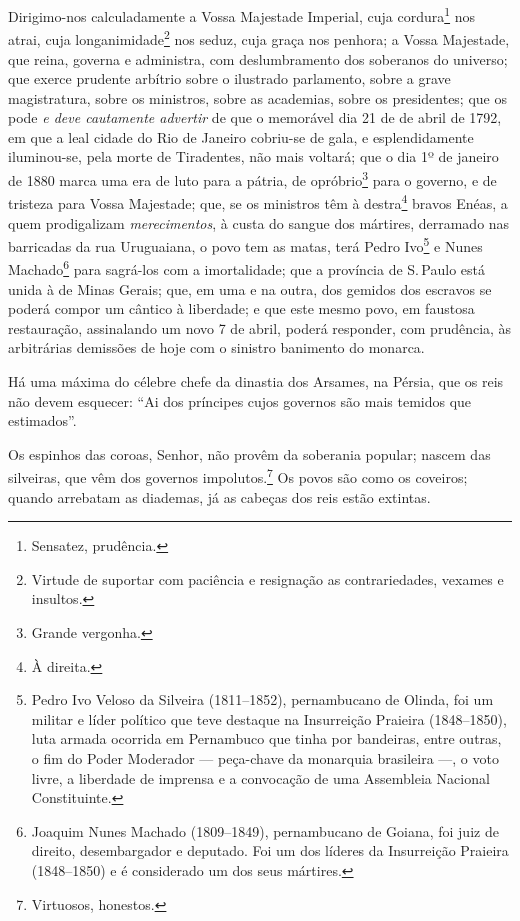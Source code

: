 {Dirigimo-nos calculadamente a Vossa Majestade Imperial, cuja
cordura\footnote{Sensatez, prudência.} nos atrai, cuja
longanimidade\footnote{Virtude de suportar com paciência e resignação
  as contrariedades, vexames e insultos.} nos seduz, cuja graça nos
penhora; a Vossa Majestade, que reina, governa e administra, com
deslumbramento dos soberanos do universo; que exerce prudente arbítrio
sobre o ilustrado parlamento, sobre a grave magistratura, sobre os
ministros, sobre as academias, sobre os presidentes; que os pode \emph{e
deve cautamente advertir} de que o memorável dia 21 de de abril de 1792,
em que a leal cidade do Rio de Janeiro cobriu-se de gala, e
esplendidamente iluminou-se, pela morte de Tiradentes, não mais voltará;
que o dia 1º de janeiro de 1880 marca uma era de luto para a pátria, de
opróbrio\footnote{Grande vergonha.} para o governo, e de tristeza para
Vossa Majestade; que, se os ministros têm à destra\footnote{À direita.}
bravos Enéas, a quem prodigalizam \emph{merecimentos}, à custa do sangue
dos mártires, derramado nas barricadas da rua Uruguaiana, o povo tem as
matas, terá Pedro Ivo\footnote{Pedro Ivo Veloso da Silveira
  (1811--1852), pernambucano de Olinda, foi um militar e líder político
  que teve destaque na Insurreição Praieira (1848--1850), luta armada
  ocorrida em Pernambuco que tinha por bandeiras, entre outras, o fim do
  Poder Moderador --- peça-chave da monarquia brasileira ---, o voto livre,
  a liberdade de imprensa e a convocação de uma Assembleia Nacional
  Constituinte.} e Nunes Machado\footnote{Joaquim Nunes Machado
  (1809--1849), pernambucano de Goiana, foi juiz de direito,
  desembargador e deputado. Foi um dos líderes da Insurreição Praieira
  (1848--1850) e é considerado um dos seus mártires.} para sagrá-los com
a imortalidade; que a província de S.\,Paulo está unida à de Minas
Gerais; que, em uma e na outra, dos gemidos dos escravos se poderá
compor um cântico à liberdade; e que este mesmo povo, em faustosa
restauração, assinalando um novo 7 de abril, poderá responder, com
prudência, às arbitrárias demissões de hoje com o sinistro banimento do
monarca.

Há uma máxima do célebre chefe da dinastia dos Arsames, na Pérsia,
que os reis não devem esquecer: ``Ai dos príncipes cujos governos são
mais temidos que estimados''.

Os espinhos das coroas, Senhor, não provêm da soberania popular; nascem
das silveiras, que vêm dos governos impolutos.\footnote{Virtuosos,
  honestos.} Os povos são como os coveiros; quando arrebatam as
diademas, já as cabeças dos reis estão extintas.

}
